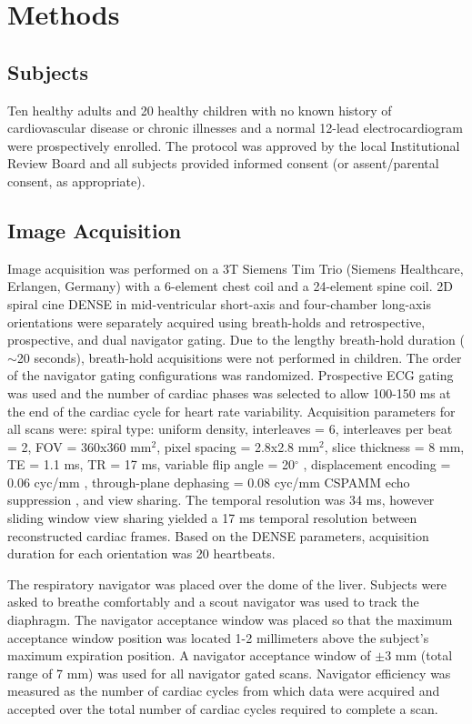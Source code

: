 \section{Methods}

\subsection{Subjects}
	Ten healthy adults and 20 healthy children with no known history of cardiovascular disease or chronic illnesses and a normal 12-lead electrocardiogram were prospectively enrolled. The protocol was approved by the local Institutional Review Board and all subjects provided informed consent (or assent/parental consent, as appropriate).

\subsection{Image Acquisition}
	Image acquisition was performed on a 3T Siemens Tim Trio (Siemens Healthcare, Erlangen, Germany) with a 6-element chest coil and a 24-element spine coil. 2D spiral cine DENSE \cite{Zhong2010a,Wehner2015} in mid-ventricular short-axis and four-chamber long-axis orientations were separately acquired using breath-holds and retrospective, prospective, and dual navigator gating. Due to the lengthy breath-hold duration ($\sim$20 seconds), breath-hold acquisitions were not performed in children. The order of the navigator gating configurations was randomized. Prospective ECG gating was used and the number of cardiac phases was selected to allow 100-150 ms at the end of the cardiac cycle for heart rate variability. Acquisition parameters for all scans were: spiral type: uniform density, interleaves = 6, interleaves per beat = 2, FOV = 360x360 mm$^2$, pixel spacing = 2.8x2.8 mm$^2$, slice thickness = 8 mm, TE = 1.1 ms, TR = 17 ms, variable flip angle = 20$^{\circ}$ \cite{Wehner2015,Stuber1999}, displacement encoding = 0.06 cyc/mm \cite{Wehner2015a}, through-plane dephasing = 0.08 cyc/mm \cite{Zhong2006} CSPAMM echo suppression \cite{Kim2004}, and view sharing. The temporal resolution was 34 ms, however sliding window view sharing yielded a 17 ms temporal resolution between reconstructed cardiac frames. Based on the DENSE parameters, acquisition duration for each orientation was 20 heartbeats.
	
	The respiratory navigator was placed over the dome of the liver. Subjects were asked to breathe comfortably and a scout navigator was used to track the diaphragm. The navigator acceptance window was placed so that the maximum acceptance window position was located 1-2 millimeters above the subject's maximum expiration position. A navigator acceptance window of $\pm$3 mm (total range of 7 mm) was used for all navigator gated scans. Navigator efficiency was measured as the number of cardiac cycles from which data were acquired and accepted over the total number of cardiac cycles required to complete a scan.

